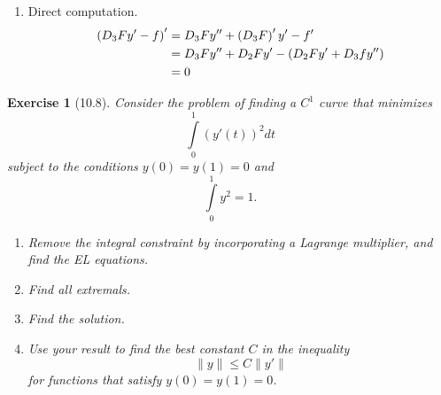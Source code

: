 \documentclass[letterpaper,twoside,11pt]{article}
\theoremstyle{mystyle}
\newtheorem*{exercise}{Exercise}
\newcommand{\cbk}{\color{black}}
\newcommand{\cblu}{\color{blue}}
\begin{document}
\cblu 

\begin{enumerate}
  \item Direct computation. 
  \begin{align*}
      \left( {{D_3}Fy' - f} \right)' &= {D_3}Fy'' + \left( {{D_3}F} \right)'y' - f' \hfill \\
       &= {D_3}Fy'' + {D_2}Fy' - \left( {{D_2}Fy' + {D_3}fy''} \right) \hfill \\
       &= 0 
  \end{align*}
\end{enumerate}

\cbk 



\begin{exercise}[10.8]
  Consider the problem of finding a $C^1$ curve that minimizes 
  \[\int\limits_0^1 (y'(t))^2 dt\]
  subject to the conditions $y(0) = y(1) = 0$ and 
  \[\int\limits_0^1 y^2 = 1.\]
  \begin{enumerate}
    \item Remove the integral constraint by incorporating a Lagrange multiplier, and find the EL equations. 
    \item Find all extremals. 
    \item Find the solution. 
    \item Use your result to find the best constant $C$ in the inequality 
    \[\|y\|\leq C \|y'\|\]
    for functions that satisfy $y(0) = y(1) = 0$. 
  \end{enumerate}
\end{exercise}

\cblu 
\end{document}
